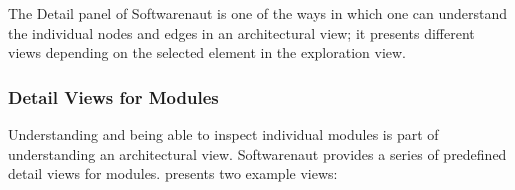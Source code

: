 \documentclass[preprint,12pt]{elsarticle}
\begin{document}
The Detail panel of Softwarenaut is one of the ways in which one can understand the individual nodes and edges in an architectural view; it presents different views depending on the selected element in the exploration view. 

\subsubsection {Detail Views for Modules}

Understanding and being able to inspect individual modules is part of understanding an architectural view. Softwarenaut provides a series of predefined detail views for modules.  presents two example views: 
\end{document}
